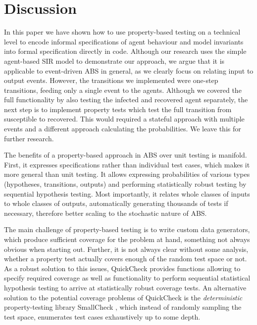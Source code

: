 \section{Discussion}
\label{sec:discussion}
In this paper we have shown how to use property-based testing on a technical level to encode informal specifications of agent behaviour and model invariants into formal specification directly in code. Although our research uses the simple agent-based SIR model to demonstrate our approach, we argue that it is applicable to event-driven ABS \cite{meyer_event-driven_2014} in general, as we clearly focus on relating input to output events. However, the transitions we implemented were one-step transitions, feeding only a single event to the agents. Although we covered the full functionality by also testing the infected and recovered agent separately, the next step is to implement property tests which test the full transition from susceptible to recovered. This would required a stateful approach with multiple events and a different approach calculating the probabilities. We leave this for further research.

The benefits of a property-based approach in ABS over unit testing is manifold. First, it expresses specifications rather than individual test cases, which makes it more general than unit testing. It allows expressing probabilities of various types (hypotheses, transitions, outputs) and performing statistically robust testing by sequential hypothesis testing. Most importantly, it relates whole classes of inputs to whole classes of outputs, automatically generating thousands of tests if necessary, therefore better scaling to the stochastic nature of ABS.

The main challenge of property-based testing is to write custom data generators, which produce sufficient coverage for the problem at hand, something not always obvious when starting out. Further, it is not always clear without some analysis, whether a property test actually covers enough of the random test space or not. As a robust solution to this issues, QuickCheck provides functions allowing to specify required coverage as well as functionality to perform sequential statistical hypothesis testing to arrive at statistically robust coverage tests. An alternative solution to the potential coverage problems of QuickCheck is the \textit{deterministic} property-testing library SmallCheck \cite{runciman_smallcheck_2008}, which instead of randomly sampling the test space, enumerates test cases exhaustively up to some depth.

